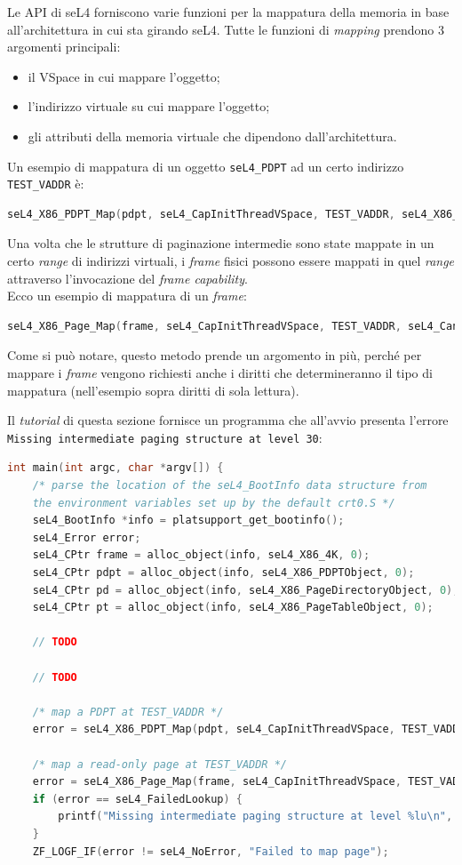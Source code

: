 Le API di seL4 forniscono varie funzioni per la mappatura della memoria in base all'architettura in cui sta girando seL4. Tutte le funzioni di \textit{mapping} prendono 3 argomenti principali:
\begin{itemize}
	\item il VSpace in cui mappare l'oggetto;
	\item l'indirizzo virtuale su cui mappare l'oggetto;
	\item gli attributi della memoria virtuale che dipendono dall'architettura.
\end{itemize}
Un esempio di mappatura di un oggetto \texttt{seL4\_PDPT} ad un certo indirizzo \texttt{TEST\_VADDR} è:
\begin{lstlisting}[language=C++]
seL4_X86_PDPT_Map(pdpt, seL4_CapInitThreadVSpace, TEST_VADDR, seL4_X86_Default_VMAttributes);
\end{lstlisting}

Una volta che le strutture di paginazione intermedie sono state mappate in un certo \textit{range} di indirizzi virtuali, i \textit{frame} fisici possono essere mappati in quel \textit{range} attraverso l'invocazione del \textit{frame capability}.\\
Ecco un esempio di mappatura di un \textit{frame}:
\begin{lstlisting}[language=C++]
seL4_X86_Page_Map(frame, seL4_CapInitThreadVSpace, TEST_VADDR, seL4_CanRead, seL4_X86_Default_VMAttributes);
\end{lstlisting}

Come si può notare, questo metodo prende un argomento in più, perché per mappare i \textit{frame} vengono richiesti anche i diritti che determineranno il tipo di mappatura (nell'esempio sopra diritti di sola lettura).

Il \textit{tutorial} di questa sezione fornisce un programma che all'avvio presenta l'errore \texttt{Missing intermediate paging structure at level 30}:
\begin{lstlisting}[language=C++]
int main(int argc, char *argv[]) {
    /* parse the location of the seL4_BootInfo data structure from
    the environment variables set up by the default crt0.S */
    seL4_BootInfo *info = platsupport_get_bootinfo();
    seL4_Error error;
    seL4_CPtr frame = alloc_object(info, seL4_X86_4K, 0);
    seL4_CPtr pdpt = alloc_object(info, seL4_X86_PDPTObject, 0);
    seL4_CPtr pd = alloc_object(info, seL4_X86_PageDirectoryObject, 0);
    seL4_CPtr pt = alloc_object(info, seL4_X86_PageTableObject, 0);

	// TODO
	
	// TODO

    /* map a PDPT at TEST_VADDR */
    error = seL4_X86_PDPT_Map(pdpt, seL4_CapInitThreadVSpace, TEST_VADDR, seL4_X86_Default_VMAttributes);

    /* map a read-only page at TEST_VADDR */
    error = seL4_X86_Page_Map(frame, seL4_CapInitThreadVSpace, TEST_VADDR, seL4_CanRead, seL4_X86_Default_VMAttributes);
    if (error == seL4_FailedLookup) {
        printf("Missing intermediate paging structure at level %lu\n", seL4_MappingFailedLookupLevel());
    }
    ZF_LOGF_IF(error != seL4_NoError, "Failed to map page");
\end{lstlisting}


